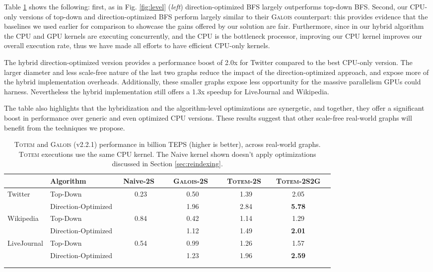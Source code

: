 \documentclass{llncs}
\begin{document}
Table \ref{table:real} shows the following: first, as in Fig. \ref{fig:level} (\textit{left}) direction-optimized BFS largely outperforms top-down BFS. Second, our CPU-only versions of top-down and direction-optimized BFS perform largely similar to their \textsc{Galois} counterpart: this provides evidence that the baselines we used earlier for comparison to showcase the gains offered by our solution are fair. Furthermore, since in our hybrid algorithm the CPU and GPU kernels are executing concurrently, and the CPU is the bottleneck processor, improving our CPU kernel improves our overall execution rate, thus we have made all efforts to have efficient CPU-only kernels.

The hybrid direction-optimized version provides a performance boost of 2.0x for Twitter compared to the best CPU-only version. The larger diameter and less scale-free nature of the last two graphs reduce the impact of the direction-optimized approach, and expose more of the hybrid implementation overheads. Additionally, these smaller graphs expose less opportunity for the massive parallelism GPUs could harness. Nevertheless the hybrid implementation still offers a 1.3x speedup for LiveJournal and Wikipedia.

The table also highlights that the hybridization and the algorithm-level optimizations are synergetic, and together, they offer a significant boost in performance over generic and even optimized CPU versions. These results suggest that other scale-free real-world graphs will benefit from the techniques we propose.
\begin{table}\centering \caption{\textsc{Totem} and \textsc{Galois} (v2.2.1) performance in billion TEPS (higher is better), across real-world graphs. \textsc{Totem} executions use the same CPU kernel. The Naive kernel shown doesn't apply optimizations discussed in Section \ref{sec:reindexing}.}\label{table:real}\begin{tabular}{@{}llccccc@{}}\toprule & Algorithm           &\ Naive-2S\ \ &\ \textsc{Galois}-2S\ \ &\ \textsc{Totem}-2S\ \ & \textsc{Totem}-2S2G \\ \midrule
\multirow{2}{*}{Twitter}     & Top-Down            & 0.23     & 0.50      & 1.39     & 2.05       \\
                             & Direction-Optimized &          & 1.96      & 2.84     & \textbf{5.78}       \\ \midrule
\multirow{2}{*}{Wikipedia}   & Top-Down            & 0.84     & 0.42      & 1.14     & 1.29       \\
                             & Direction-Optimized &          & 1.12      & 1.49     & \textbf{2.01}       \\ \midrule
\multirow{2}{*}{LiveJournal} & Top-Down            & 0.54     & 0.99      & 1.26     & 1.57       \\
                             & Direction-Optimized &          & 1.23      & 1.96     & \textbf{2.59}       \\ \bottomrule
\\\\                            
\end{tabular}
\end{table}
\end{document}
